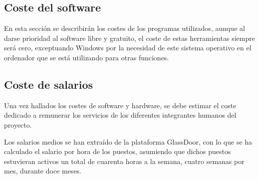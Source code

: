 \subsection{Coste del software}

En esta sección se describirán los costes de los programas utilizados, aunque al darse prioridad al software libre y gratuito, el coste de estas herramientas siempre será cero, exceptuando Windows por la necesidad de este sistema operativo en el ordenador que se está utilizando para otras funciones.

\begin{table}[H]
    \caption[Presupuesto de software]{Lista de software utilizado con coste. Elaboración propia}
    \end{table}


\subsection{Coste de salarios}

Una vez hallados los costes de software y hardware, se debe estimar el coste dedicado a remunerar los servicios de los diferentes integrantes humanos del proyecto. 

Los salarios medios se han extraído de la plataforma GlassDoor, con lo que se ha calculado el salario por hora de los puestos, asumiendo que dichos puestos estuvieran activos un total de cuarenta horas a la semana, cuatro semanas por mes, durante doce meses. 

